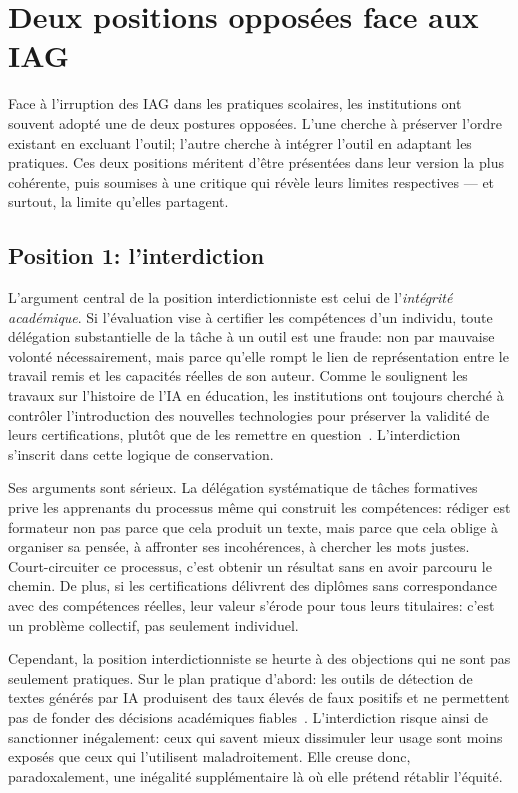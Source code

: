 \section{Deux positions opposées face aux IAG}\label{sec:positions}

Face à l'irruption des IAG dans les pratiques scolaires, les institutions ont souvent adopté une de deux postures opposées. 
L'une cherche à préserver l'ordre existant en excluant l'outil; l'autre cherche à intégrer l'outil en adaptant les pratiques. 
Ces deux positions méritent d'être présentées dans leur version la plus cohérente, puis soumises à une critique qui révèle leurs limites respectives --- et surtout, la limite qu'elles partagent.

\subsection*{Position 1: l'interdiction}

L'argument central de la position interdictionniste est celui de l'\emph{intégrité académique}. 
Si l'évaluation vise à certifier les compétences d'un individu, toute délégation substantielle de la tâche à un outil est une fraude: non par mauvaise volonté nécessairement, mais parce qu'elle rompt le lien de représentation entre le travail remis et les capacités réelles de son auteur. 
Comme le soulignent les travaux sur l'histoire de l'IA en éducation, les institutions ont toujours cherché à contrôler l'introduction des nouvelles technologies pour préserver la validité de leurs certifications, plutôt que de les remettre en question~\citep{lepage2023recension}. 
L'interdiction s'inscrit dans cette logique de conservation.

Ses arguments sont sérieux. 
La délégation systématique de tâches formatives prive les apprenants du processus même qui construit les compétences: rédiger est formateur non pas parce que cela produit un texte, mais parce que cela oblige à organiser sa pensée, à affronter ses incohérences, à chercher les mots justes. 
Court-circuiter ce processus, c'est obtenir un résultat sans en avoir parcouru le chemin. 
De plus, si les certifications délivrent des diplômes sans correspondance avec des compétences réelles, leur valeur s'érode pour tous leurs titulaires: c'est un problème collectif, pas seulement individuel.

Cependant, la position interdictionniste se heurte à des objections qui ne sont pas seulement pratiques. 
Sur le plan pratique d'abord: les outils de détection de textes générés par IA produisent des taux élevés de faux positifs et ne permettent pas de fonder des décisions académiques fiables~\citep{leroux2015evaluer}. 
L'interdiction risque ainsi de sanctionner inégalement: ceux qui savent mieux dissimuler leur usage sont moins exposés que ceux qui l'utilisent maladroitement. 
Elle creuse donc, paradoxalement, une inégalité supplémentaire là où elle prétend rétablir l'équité.

